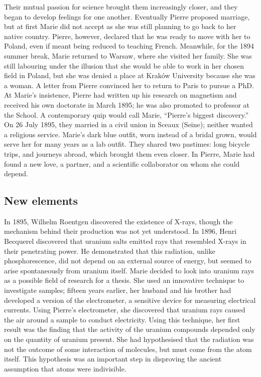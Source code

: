 \documentclass[12pt,a4paper]{article}
\begin{document}
Their mutual passion for science brought them increasingly closer, and they began to develop feelings for one another. Eventually Pierre proposed marriage, but at first Marie did not accept as she was still planning to go back to her native country. Pierre, however, declared that he was ready to move with her to Poland, even if meant being reduced to teaching French. Meanwhile, for the 1894 summer break, Marie returned to Warsaw, where she visited her family. She was still labouring under the illusion that she would be able to work in her chosen field in Poland, but she was denied a place at Krak\'ow University because she was a woman. A letter from Pierre convinced her to return to Paris to pursue a PhD. At Marie's insistence, Pierre had written up his research on magnetism and received his own doctorate in March 1895; he was also promoted to professor at the School. A contemporary quip would call Marie, ``Pierre's biggest discovery.'' On 26 July 1895, they married in a civil union in Sceaux (Seine); neither wanted a religious service. Marie's dark blue outfit, worn instead of a bridal grown, would serve her for many years as a lab outfit. They shared two pastimes: long bicycle trips, and journeys abroad, which brought them even closer. In Pierre, Marie had found a new love, a partner, and a scientific collaborator on whom she could depend.

\subsection{New elements}

In 1895, Wilhelm Roentgen discovered the existence of X-rays, though the mechanism behind their production was not yet understood. In 1896, Henri Becquerel discovered that uranium salts emitted rays that resembled X-rays in their penetrating power. He demonstrated that this radiation, unlike phosphorescence, did not depend on an external source of energy, but seemed to arise spontaneously from uranium itself. Marie decided to look into uranium rays as a possible field of research for a thesis. She used an innovative technique to investigate samples; fifteen years earlier, her husband and his brother had developed a version of the electrometer, a sensitive device for measuring electrical currents. Using Pierre's electrometer, she discovered that uranium rays caused the air around a sample to conduct electricity. Using this technique, her first result was the finding that the activity of the uranium compounds depended only on the quantity of uranium present. She had hypothesised that the radiation was not the outcome of some interaction of molecules, but must come from the atom itself. This hypothesis was an important step in disproving the ancient assumption that atoms were indivisible.
\end{document}
